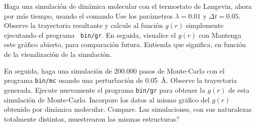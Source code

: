 Haga una simulación de dinámica molecular con el termostato de Langevin,
ahora por más tiempo, 
usando el comando 
Use los parámetros
$\lambda=0.01$ y $\Delta t=0.05$. Observe la trayectoria resultante y
calcule al función $g(r)$ simplemente ejecutando el programa {\tt
bin/gr}. En seguida, visualice el $g(r)$ con
Mantenga este gráfico abierto, para comparación futura. Entienda que
significa, en función de la visualización de la simulación. 

En seguida, haga una simulación de 200.000 pasos de Monte-Carlo con el programa 
{\tt bin/mc} usando una perturbación de 0.05~\AA. Observe la trayectoria
generada. Ejecute nuevamente el
programa {\tt bin/gr} para obtener la $g(r)$ de esta simulación de
Monte-Carlo. Incorpore los datos al mismo gráfico del $g(r)$ obtenido
por dinámica molecular. Compare. Las simulaciones, con sus naturalezas
totalmente distintas, muestrearon las mismas estructuras?  





















